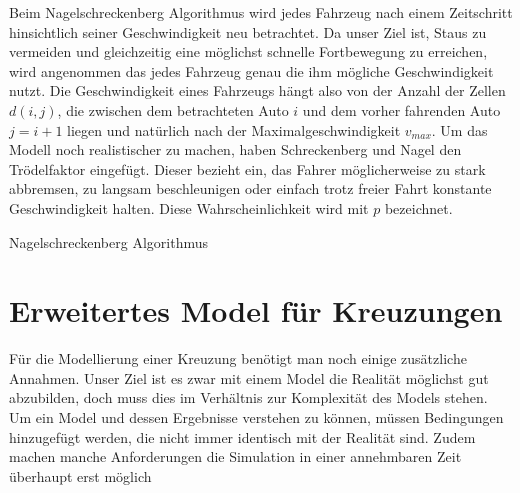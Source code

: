 Beim Nagelschreckenberg Algorithmus wird jedes Fahrzeug nach einem Zeitschritt hinsichtlich seiner Geschwindigkeit neu betrachtet. Da unser Ziel ist, Staus zu vermeiden und gleichzeitig eine möglichst schnelle Fortbewegung zu erreichen, wird angenommen das jedes Fahrzeug genau die ihm mögliche Geschwindigkeit nutzt. Die Geschwindigkeit eines Fahrzeugs hängt also von der Anzahl der Zellen $d(i,j)$, die zwischen dem betrachteten Auto $i$ und dem vorher fahrenden Auto $j=i+1$ liegen und natürlich nach der Maximalgeschwindigkeit \( v_{max} \). Um das Modell noch realistischer zu machen, haben Schreckenberg und Nagel den Trödelfaktor eingefügt. Dieser bezieht ein, das Fahrer möglicherweise zu stark abbremsen, zu langsam beschleunigen oder einfach trotz freier Fahrt konstante Geschwindigkeit halten. Diese Wahrscheinlichkeit wird mit $p$ bezeichnet.\\ 


\begin{algorithm}[H]

 
 \caption{Nagelschreckenberg Algorithmus}
 \label{algo:nagelsberg}
\end{algorithm}



\section{Erweitertes Model für Kreuzungen} \label{sec:erwmodel}
Für die Modellierung einer Kreuzung benötigt man noch einige zusätzliche Annahmen. Unser Ziel ist es zwar mit einem Model die Realität möglichst gut abzubilden, doch muss dies im Verhältnis zur Komplexität des Models stehen. Um ein Model und dessen Ergebnisse verstehen zu können, müssen Bedingungen hinzugefügt werden, die nicht immer identisch mit der Realität sind. Zudem machen manche Anforderungen die Simulation in einer annehmbaren Zeit überhaupt erst möglich \\


